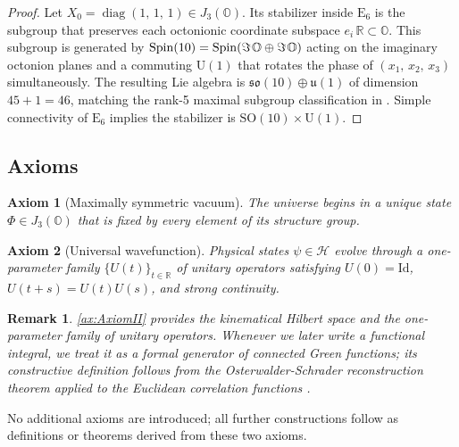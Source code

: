 \documentclass[pdflatex,sn-mathphys-num]{sn-jnl}
\theoremstyle{thmstyleone}
\theoremstyle{thmstyletwo}%
\newtheorem{remark}{Remark}%
\theoremstyle{thmstylethree}%
\newtheorem{axiom}{Axiom}
\newcommand{\SO}[1]{\mathrm{SO(#1)}}
\newcommand{\U}[1]{\mathrm{U(#1)}}
\newcommand{\E}[1]{\mathrm{E_{#1}}}
\newcommand{\Oct}{\mathbb{O}}
\newcommand{\jalg}{J_3(\mathbb{O})}
\newcommand{\SOTen}{\SO{10}}
\newcommand{\UOne}{\U{1}}
\newcommand{\ESix}{\E{6}}
\newcommand{\SOTenXUOne}{\SOTen \times \UOne}
\newcommand{\s}{\hspace{.1em}}
\newcommand{\Spin}{\operatorname{Spin}}
\begin{document}
\begin{proof}
Let $X_{0}=\operatorname{diag}(1,\,1,\,1)\in\jalg$.
Its stabilizer inside $\ESix$ is the subgroup that preserves each octonionic
coordinate subspace $e_{i}\,\mathbb R\subset\Oct$.
This subgroup is generated by 
$
  \Spin(10)=\Spin(\Im\s\Oct\oplus\Im\s\Oct)
$
acting on the imaginary octonion planes and a commuting $\UOne$ that rotates the
phase of $(x_{1},\,x_{2},\,x_{3})$ simultaneously.
The resulting Lie algebra is $\mathfrak{so}(10)\oplus\mathfrak u(1)$ of dimension
$45+1=46$, matching the rank-5 maximal subgroup classification in \cite{Slansky:1981}.
Simple connectivity of $\ESix$ implies the stabilizer is $\SOTenXUOne$.
\end{proof}

\subsection{Axioms}\label{subsec:Axioms}

\begin{axiom}[Maximally symmetric vacuum]\label{ax:AxiomI}
The universe begins in a unique state $\Phi\in\jalg$ that is fixed by every element of its structure group.
\end{axiom}

\begin{axiom}[Universal wavefunction]\label{ax:AxiomII}
Physical states $\psi\in\mathcal H$ evolve through a one-parameter family
$\{U(t)\}_{t\in\mathbb R}$ of unitary operators satisfying $U(0)=\mathrm{Id}$, $U(t+s)=U(t)U(s)$, and strong continuity.
\end{axiom}

\begin{remark}
\autoref{ax:AxiomII} provides the kinematical Hilbert space and the one-parameter
family of unitary operators.  Whenever we later write a functional integral, we treat it as a formal generator of connected Green functions; its constructive definition follows from the Osterwalder-Schrader reconstruction theorem applied to the Euclidean correlation functions \cite{GlimmJaffe:1987}.
\end{remark}


No additional axioms are introduced; all further constructions follow as definitions or theorems derived from these two axioms.

\end{document}
